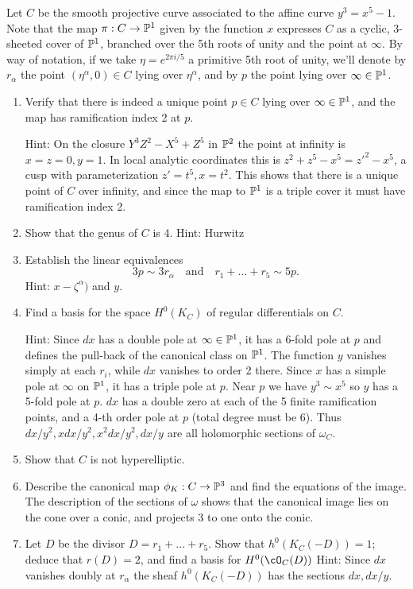 \begin{exercise}
Let $C$ be the smooth projective curve associated to the affine curve 
$y^3 = x^5 -1$. 
Note that the map $\pi : C \to \PP^1$ given by the function $x$ expresses $C$ as a cyclic, 3-sheeted cover of $\PP^1$, branched over the 5th roots of unity and the point at $\infty$. By way of notation, if we take $\eta = e^{2\pi i/5}$ a primitive 5th root of unity, we'll denote by $r_\alpha$ the point $(\eta^\alpha, 0) \in C$ lying over $\eta^\alpha$, and by $p$ the point lying over $\infty \in \PP^1$.

\begin{enumerate}
\item Verify that there is indeed a unique point $p \in C$ lying over $\infty \in \PP^1$, and the map has ramification index 2 at $p$. 

Hint: On the closure  $Y^3Z^2-X^5+Z^5$ in $\PP^2$ the point at infinity is $x=z=0, y=1$. In local analytic coordinates this is
$z^2+z^5-x^5 = z'^2-x^5$, a cusp with parameterization $z'=t^5, x= t^2$. This shows that there is a unique point of $C$
over infinity, and since the map to $\PP^1$ is a triple cover it must have ramification index 2. 

\item Show that the genus of $C$ is 4. Hint: Hurwitz

\item Establish the linear equivalences
$$
3p \sim 3r_\alpha \quad \text{and} \quad r_1+ \dots + r_5 \sim 5p. 
$$
Hint: $x-\zeta^\alpha)$ and $y$.
\item Find a basis for the space $H^0(K_C)$ of regular differentials on $C$.

Hint: Since
$dx$ has a double pole at $\infty \in \PP^1$, it has a 6-fold pole at $p$ and defines the pull-back of the canonical
class on $\PP^1$. The function $y$ vanishes simply
at each $r_i$, while $dx$ vanishes to order 2 there.
Since $x$ has a simple pole at $\infty$ on $\PP^1$, it has a triple pole at $p$.
Near $p$ we have $y^3\sim x^5$ so $y$ has a 5-fold pole at $p$. 
$dx$ has a double zero at each of the  5 finite ramification points, and a 4-th order pole at $p$ (total degree must be 6).
Thus $dx/y^2, xdx/y^2, x^2dx/y^2, dx/y$ are all holomorphic sections of $\omega_C$.

\item Show that $C$ is not hyperelliptic.
\item Describe the canonical map $\phi_K : C \to \PP^3$ and find the equations of the image.
The description of the sections of $\omega$  shows that the canonical image lies on the cone over a conic,
and projects 3 to one onto the conic.
\item Let $D$ be the divisor $D = r_1+\dots+r_5$. Show that $h^0(K_C(-D)) = 1$; deduce that $r(D) = 2$, and find a basis for $H^0(\cO_C(D))$
Hint:  Since $dx$ vanishes doubly at $r_\alpha$ the sheaf $h^0(K_C(-D))$ has the sections $dx, dx/y$.


\end{enumerate}
\end{exercise}
